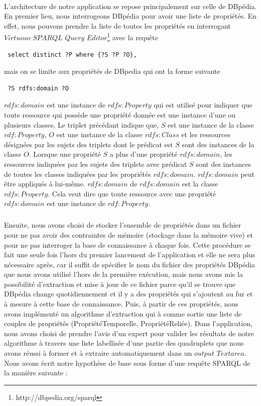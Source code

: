 \documentclass[12pt,a4	]{report}
\begin{document}
\paragraph{}
L'architecture de notre application se repose principalement sur celle de DBpédia. En premier lieu, nous interrogeons DBpédia pour avoir une liste de propriétés. En effet, nous pouvons prendre la liste de toutes les propriétés en interrogant $Virtuoso$ $SPARQL$ $Query$ $Editor$\footnote{http://dbpedia.org/sparql}  avec la requête \begin{verbatim} select distinct ?P where {?S ?P ?O},\end{verbatim}mais on se limite aux propriétés de DBpedia qui ont la forme suivante \begin{verbatim} ?S rdfs:domain ?O \end{verbatim} $rdfs:domain$ est une instance de $rdfs:Property$ qui est utilisé pour indiquer que toute ressource qui possède une propriété donnée est une instance d'une ou plusieurs classes. Le triplet précédant indique que, $S$ est une instance de la classe $rdf:Property$, $O$ est une instance de la classe $rdfs:Class$ et les ressources désignées par les sujets des triplets dont le prédicat est $S$ sont des instances de la classe $O$. Lorsque une propriété $S$ a plus d'une propriété $rdfs:domain$, les ressources indiquées par les sujets des triplets avec prédicat $S$ sont des instances de toutes les classes indiquées par les propriétés $rdfs:domain$. $rdfs:domain$ peut être appliqués à lui-même. $rdfs:domain$ de $rdfs:domain$ est la classe $rdfs:Property$. Cela veut dire que toute ressource avec une propriété $rdfs:domain$ est une instance de $rdf:Property$. 
\subparagraph{}
Ensuite, nous avons choisi de stocker l'ensemble de propriétés dans un fichier pour ne pas avoir des contraintes de mémoire (stockage dans la mémoire vive) et pour ne pas interroger la base de connaissance à chaque fois. Cette procédure se fait une seule fois l'hors du premier lancement de l'application et elle ne sera plus nécessaire après, car il suffit de spécifier le nom du fichier des propriétés DBpédia que nous avons utilisé l'hors de la première exécution, mais nous avons mis la possibilité d'extraction et mise à jour de ce fichier parce qu'il se trouve que DBpédia change quotidiennement et il y a des propriétés qui s'ajoutent au fur et à mesure à cette base de connaissance. Puis, à partir de ces propriétés, nous avons implémenté un algorithme d'extraction qui à comme sortie une liste de couples de propriétés (PropriétéTemporelle, PropriétéReliée). Dans l'application, nous avons choisi de prendre l'avis d'un expert pour valider les résultats de notre algorithme à travers une liste labellisée d'une partie des quadruplets que nous avons réussi à former et à extraire automatiquement dans un $output$ $Textarea$. Nous avons écrit notre hypothèse de base sous forme d'une requête SPARQL de la manière suivante :
\end{document}
